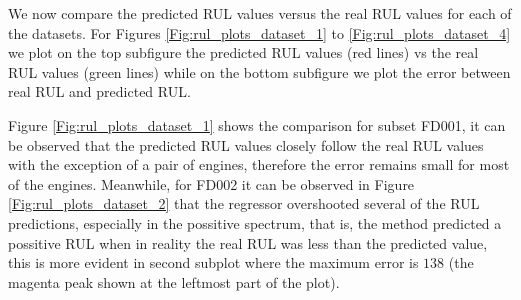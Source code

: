 \documentclass[preprint,12pt]{elsarticle}%
\begin{document}
We now compare the predicted RUL values versus the real RUL values for each of the datasets. For Figures \ref{Fig:rul_plots_dataset_1} to \ref{Fig:rul_plots_dataset_4} we plot on the top subfigure the predicted RUL values (red lines) vs the real RUL values (green lines) while on the bottom subfigure we plot the error between real RUL and predicted RUL.

Figure \ref{Fig:rul_plots_dataset_1} shows the comparison for subset FD001, it can be observed that the predicted RUL values closely follow the real RUL values with the exception of a pair of engines, therefore the error remains small for most of the engines. Meanwhile, for FD002 it can be observed in Figure \ref{Fig:rul_plots_dataset_2} that the regressor overshooted several of the RUL predictions, especially in the possitive spectrum, that is, the method predicted a possitive RUL when in reality the real RUL was less than the predicted value, this is more evident in second subplot where the maximum error is $138$ (the magenta peak shown at the leftmost part of the plot).
\end{document}
